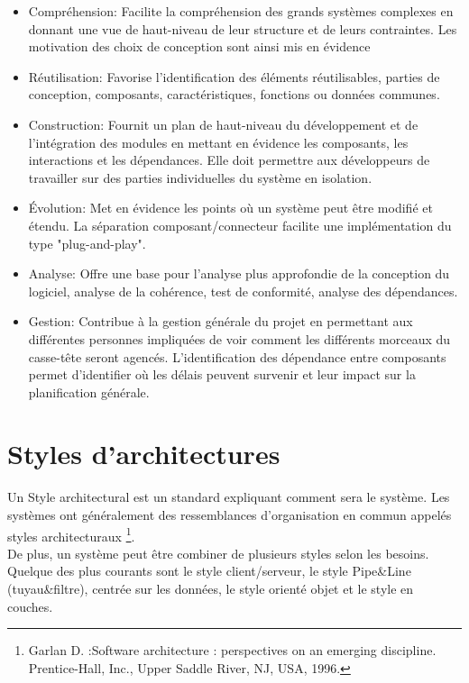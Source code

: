 \documentclass[12pt, a4paper, openany]{report}
\begin{document}
  \begin{itemize}
      \item  Compréhension:
      Facilite la compréhension des grands systèmes complexes en donnant une vue de haut-niveau de leur structure et de leurs contraintes. 
      Les motivation des choix de conception sont ainsi mis en évidence
      \item  Réutilisation:
      Favorise l’identification des éléments réutilisables, parties de conception, composants, caractéristiques, fonctions ou données communes.
      \item  Construction:
      Fournit un plan de haut-niveau du développement et de l’intégration des modules en mettant en évidence les composants, les interactions et les dépendances. Elle doit permettre aux développeurs de travailler sur des parties individuelles du système en isolation.
      \item  Évolution:
      Met en évidence les points où un système peut être modifié et étendu. La séparation composant/connecteur facilite une implémentation du type "plug-and-play".
      \item  Analyse:
      Offre une base pour l’analyse plus approfondie de la conception du logiciel, analyse de la cohérence, test de conformité, analyse des dépendances.
      \item  Gestion:
      Contribue à la gestion générale du projet en permettant aux différentes personnes impliquées de voir comment les différents morceaux du casse-tête seront agencés. L’identification des dépendance entre composants permet d’identifier où les délais peuvent survenir et leur impact sur la planification générale.
  \end{itemize}
  
 \section{Styles d’architectures}
 Un Style architectural est un standard expliquant comment sera le système. Les systèmes ont généralement des ressemblances d’organisation en commun appelés styles architecturaux \cite{refbib4} \footnote{Garlan D. :Software architecture : perspectives on an emerging discipline. Prentice-Hall, Inc., Upper Saddle River, NJ, USA, 1996.}.\\
 
 De plus, un système peut être combiner de plusieurs styles selon les besoins. Quelque des plus courants sont  le style client/serveur, le style Pipe\&Line (tuyau\&filtre), centrée sur les données, le style orienté objet et le style en couches.\\
 
\end{document}
